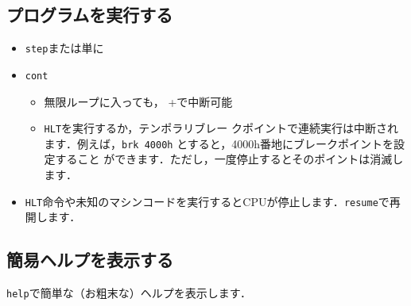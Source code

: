 \documentclass{jsarticle}
\begin{document}
\subsection{プログラムを実行する}
\begin{itemize}
\item \verb|step|\return または単に\return {}
\item
\verb|cont|\return {}
\begin{itemize}
\item 無限ループに入っても， +で中断可能
\item \verb|HLT|を実行するか，{\gt テンポラリブレー
     クポイント}で連続実行は中断されます．例えば，\verb|brk 4000h|\return
      とすると，4000h番地にブレークポイントを設定すること
      ができます．ただし，一度停止するとそのポイントは消滅します．
\end{itemize}
\item  \verb|HLT|命令や未知のマシンコードを実行するとCPUが停止します．\verb|resume|\return で再開します．
\end{itemize}
\subsection{簡易ヘルプを表示する}
\verb|help|\return で簡単な（お粗末な）ヘルプを表示します．
\end{document}
